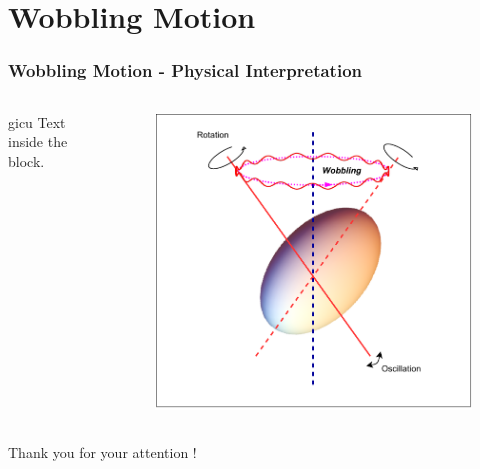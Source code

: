 \documentclass[
	11pt, %
]{beamer}
\begin{document}
\section{Wobbling Motion}

\begin{frame}
	\frametitle{Wobbling Motion - Physical Interpretation}
		\begin{columns}
			\begin{column}{0.5\textwidth}
				\begin{block}{gicu}
					Text inside the block.
				\end{block}
			\end{column}
			\begin{column}{0.5\textwidth}
				\begin{figure}
					\includegraphics[width=\textwidth]{figures/wobbling_drawing.pdf}
				\end{figure}
			\end{column}
		\end{columns}
\end{frame}


\begin{frame}[plain] %
	\begin{center}
		\bigskip\bigskip %
		{\Huge Thank you for your attention !}
	\end{center}
\end{frame}

\end{document}
